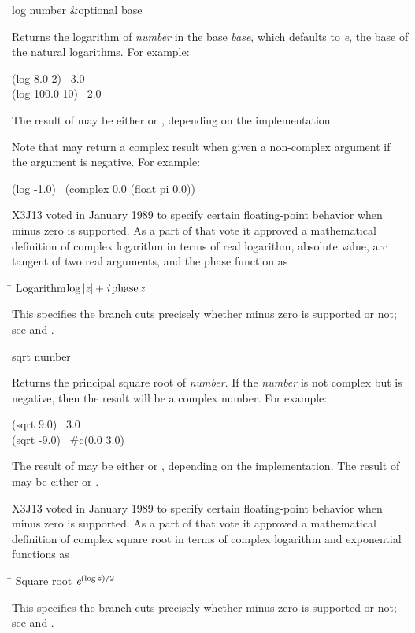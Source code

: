 \begin{defun}[Function]
log number &optional base

Returns the logarithm of \emph{number} in the base \emph{base},
which defaults to \emph{e}, the base of the natural logarithms.
For example:
\begin{lisp}
(log 8.0 2) \EV\ 3.0 \\
(log 100.0 10) \EV\ 2.0
\end{lisp}
The result of  may be either  or , depending on the
implementation.

Note that  may return a complex result when given a non-complex
argument if the argument is negative.  For example:
\begin{lisp}
(log -1.0) \EQ\ (complex 0.0 (float pi 0.0))
\end{lisp}

\begin{new}
X3J13 voted in January 1989
to specify certain floating-point behavior when minus zero is supported.
As a part of that vote it approved a mathematical definition of complex logarithm
in terms of real logarithm, absolute value,
arc tangent of two real arguments, and the phase function as
\begin{tabbing}
\hskip 10pc\=\kill
Logarithm\>$ \log \left| \emph{z} \right| + \emph{i} \mathop\textrm{phase}\nolimits \emph{z} $
\end{tabbing}
This specifies the branch cuts precisely whether minus zero is supported or not;
see  and .
\end{new}
\end{defun}

\begin{defun}[Function]
sqrt number

Returns the principal square root of \emph{number}.
If the \emph{number} is not complex but is negative, then the result
will be a complex number.
For example:
\begin{lisp}
(sqrt 9.0) \EV\ 3.0 \\
(sqrt -9.0) \EV\ \#c(0.0 3.0)
\end{lisp}
The result of  may be either  or , depending on the
implementation.  The result of  may be either 
or .

\begin{new}
X3J13 voted in January 1989
to specify certain floating-point behavior when minus zero is supported.
As a part of that vote it approved a mathematical definition of complex square root
in terms of complex logarithm and exponential functions as
\begin{tabbing}
\hskip 10pc\=\kill
Square root\> $ \emph{e}^{(\log z)/2} $
\end{tabbing}
This specifies the branch cuts precisely whether minus zero is supported or not;
see  and .
\end{new}
\end{defun}

